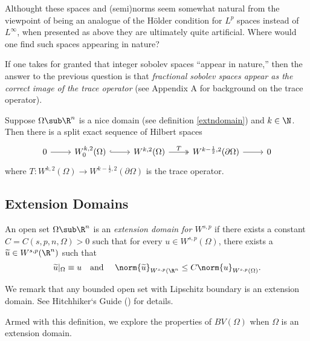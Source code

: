 \documentclass[../main.tex]{subfiles}
\begin{document}
Althought these spaces and (semi)norms seem somewhat natural from the viewpoint of being an analogue of the H\"{o}lder condition for $ L^{p} $ spaces instead of $ L^{\infty} $, when presented as above they are ultimately quite artificial. Where would one find such spaces appearing in nature?

If one takes for granted that integer sobolev spaces ``appear in nature,'' then the answer to the previous question is that \textit{fractional sobolev spaces appear as the correct image of the trace operator} (see Appendix A for background on the trace operator).

\begin{proposition}
    Suppose $ \Omega\sub \R^{n} $ is a nice domain (see definition \ref{extndomain}) and $ k\in \N $. Then there is a split exact sequence of Hilbert spaces
\[\begin{tikzcd}
    0 & {W_0^{k,2}(\Omega)} & {W^{k,2}(\Omega)} & {W^{k-\frac{1}{2},2}(\partial\Omega)} & 0
	\arrow[from=1-1, to=1-2]
	\arrow[hook, from=1-2, to=1-3]
	\arrow["T", two heads, from=1-3, to=1-4]
	\arrow[from=1-4, to=1-5]
\end{tikzcd}\]
    where $ T: W^{k,2}(\Omega) \to W^{k-\frac{1}{2},2}(\partial\Omega)$ is the trace operator.
    
\end{proposition}

\subsection{Extension Domains}

\begin{definition}\label{extndomain}
    An open set $ \Omega\sub \R^{n} $ is an \textit{extension domain for $ W^{s,p} $} if  there exists a constant $ C = C(s,p,n,\Omega) > 0 $ such that for every $ u\in W^{s,p}(\Omega) $, there exists a $ \widetilde{u}\in W^{s,p}(\R^{n}) $ such that 
    \[
        \widetilde{u}\vert_{\Omega} \equiv u \quad\text{and }\quad \norm{\widetilde{u}}_{W^{s,p}(\R^{n}}\leq C \norm{u}_{W^{s,p}(\Omega)}.
    \]
\end{definition}

We remark that any bounded open set with Lipschitz boundary is an extension domain. See Hitchhiker`s Guide (\cite{hitchhiker}) for details. 

Armed with this definition, we explore the properties of $ BV(\Omega) $ when $ \Omega $ is an extension domain.
\end{document}
